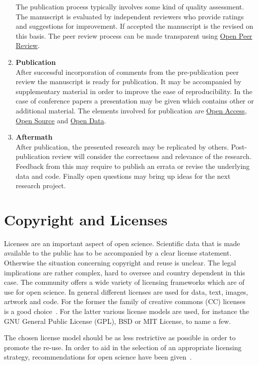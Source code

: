 \documentclass[a4paper, 10pt, twocolumn]{article}
\begin{document}
\begin{enumerate}
The publication process typically involves some kind of quality assessment. The manuscript is evaluated by
independent reviewers who provide ratings and suggestions for improvement. If accepted the manuscript is
the revised on this basis. The peer review process can be made transparent using \underline{Open Peer Review}.
%
\item \textbf{Publication}\\
After successful incorporation of comments from the pre-publication peer review the manuscript is ready for
publication. It may be accompanied by supplementary material in order to improve the ease of reproducibility. In the
case of conference papers a presentation may be given which contains other or additional material. The elements involved
for publication are \underline{Open Access}, \underline{Open Source} and \underline{Open Data}.
%
\item \textbf{Aftermath}\\
After publication, the presented research may be replicated by others. Post-publication
review will consider the correctness and relevance of the research. Feedback from this
may require to publish an errata or revise the underlying data and code. Finally open 
questions may bring up ideas for the next research project.
\end{enumerate}


\section*{Copyright and Licenses} \label{sec:copyright}

Licenses are an important aspect of open science. Scientific data that is made 
available to the public has to be accompanied by a clear license statement. Otherwise
the situation concerning copyright and reuse is unclear. The legal implications are
rather complex, hard to oversee and country dependent in this case. The community offers
a wide variety of licensing frameworks which are of use for open science. In general different 
licenses are used for data, text, images, artwork and code. For the former the family of 
creative commons (CC) licenses~\cite{CC} is a good choice~\cite{Kreuzer14:Book}. For the
latter various license models are used, for instance the GNU General Public License (GPL), 
BSD or MIT License, to name a few.

The chosen license model should be as less restrictive as possible in order to promote the
re-use. In order to aid in the selection of an appropriate licensing strategy, recommendations
for open science have been given~\cite{Stodden09:CSE,}.
\end{document}
